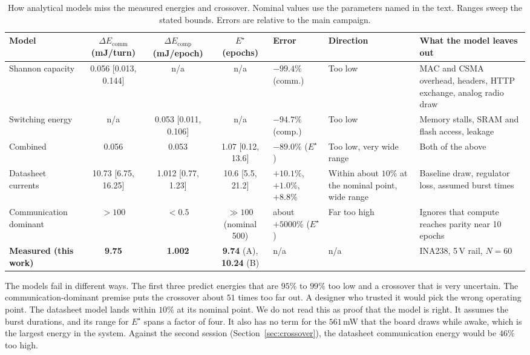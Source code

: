 \documentclass[journal]{IEEEtran}
\newcommand{\Estar}{E^{\star}}
\begin{document}
\begin{table}[t]
\centering
\caption{How analytical models miss the measured energies and crossover. Nominal values use the parameters named in the text. Ranges sweep the stated bounds. Errors are relative to the main campaign.}
\label{tab:mismatch}
\scriptsize
\setlength{\tabcolsep}{3pt}
\begin{tabular}{p{1.9cm}cccp{2.0cm}p{1.9cm}p{3.5cm}}
\toprule
Model & $\Delta E_{\mathrm{comm}}$ (mJ/turn) & $\Delta E_{\mathrm{comp}}$ (mJ/epoch) & $\Estar$ (epochs) & Error & Direction & What the model leaves out \\
\midrule
Shannon capacity & 0.056 [0.013, 0.144] & n/a & n/a & $-99.4\%$ (comm.) & Too low & MAC and CSMA overhead, headers, HTTP exchange, analog radio draw \\
Switching energy & n/a & 0.053 [0.011, 0.106] & n/a & $-94.7\%$ (comp.) & Too low & Memory stalls, SRAM and flash access, leakage \\
Combined & 0.056 & 0.053 & 1.07 [0.12, 13.6] & $-89.0\%$ ($\Estar$) & Too low, very wide range & Both of the above \\
Datasheet currents & 10.73 [6.75, 16.25] & 1.012 [0.77, 1.23] & 10.6 [5.5, 21.2] & $+10.1\%$, $+1.0\%$, $+8.8\%$ & Within about $10\%$ at the nominal point, wide range & Baseline draw, regulator loss, assumed burst times \\
Communication dominant & $>100$ & $<0.5$ & $\gg100$ (nominal 500) & about $+5000\%$ ($\Estar$) & Far too high & Ignores that compute reaches parity near 10 epochs \\
\midrule
\textbf{Measured (this work)} & \textbf{9.75} & \textbf{1.002} & \textbf{9.74} (A), \textbf{10.24} (B) & n/a & n/a & INA238, 5\,V rail, $N=60$ \\
\bottomrule
\end{tabular}
\end{table}

The models fail in different ways. The first three predict energies that are $95\%$ to $99\%$ too low and a crossover that is very uncertain. The communication-dominant premise puts the crossover about $51$ times too far out. A designer who trusted it would pick the wrong operating point. The datasheet model lands within $10\%$ at its nominal point. We do not read this as proof that the model is right. It assumes the burst durations, and its range for $\Estar$ spans a factor of four. It also has no term for the $561$\,mW that the board draws while awake, which is the largest energy in the system. Against the second session (Section~\ref{sec:crossover}), the datasheet communication energy would be $46\%$ too high.
\end{document}
